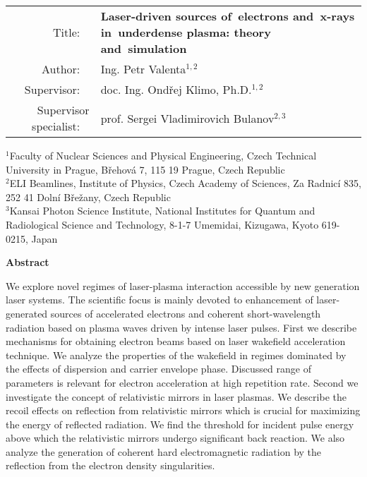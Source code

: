 \documentclass[10pt, twoside, a4paper, openright]{report}
\newcommand{\projecttitle}{Laser-driven sources of~electrons and~x-rays in~underdense plasma: theory and~simulation}
\newcommand{\valenta}{Ing. Petr Valenta}
\newcommand{\klimo}{doc. Ing. Ondřej Klimo, Ph.D.}
\newcommand{\bulanov}{prof. Sergei Vladimirovich Bulanov}
\newcommand{\keywordscz}{}
\begin{document}



\newpage
\begin{flushleft}
	\renewcommand{\arraystretch}{1.3}
	\begin{tabular}{r p{8cm}}
		Title:
		~ & \bf \projecttitle \\
		Author:
		~ & \valenta$ ^{1, 2} $ \\
		Supervisor:
		~ & \klimo$ ^{1, 2} $ \\
		Supervisor specialist:
		~ & \bulanov$ ^{2, 3} $ \\
	\end{tabular}
\end{flushleft}

\noindent $^{1} $Faculty of Nuclear Sciences and Physical Engineering, Czech Technical University in Prague, Břehová 7, 115 19 Prague, Czech Republic \\[2mm]
\noindent $^{2} $ELI Beamlines, Institute of Physics, Czech Academy of Sciences, Za Radnicí 835, 252 41 Dolní Břežany, Czech Republic \\[2mm]
\noindent $^{3} $Kansai Photon Science Institute, National Institutes for Quantum and Radiological Science and Technology, 8-1-7 Umemidai, Kizugawa, Kyoto 619-0215, Japan \\[2mm]

\begin{center}
	\bf Abstract \\
\end{center}

We explore novel regimes of laser-plasma interaction accessible by new generation laser systems. The scientific focus is mainly devoted to enhancement of laser-generated sources of accelerated electrons and coherent short-wavelength radiation based on plasma waves driven by intense laser pulses. First we describe mechanisms for obtaining electron beams based on laser wakefield acceleration technique. We analyze the properties of the wakefield in regimes dominated by the effects of dispersion and carrier envelope phase. Discussed range of parameters is relevant for electron acceleration at high repetition rate. Second we investigate the concept of relativistic mirrors in laser plasmas. We describe the recoil effects on reflection from relativistic mirrors which is crucial for maximizing the energy of reflected radiation. We find the threshold for incident pulse energy above which the relativistic mirrors undergo significant back reaction. We also analyze the generation of coherent hard electromagnetic radiation by the reflection from the electron density singularities.\\
\end{document}
